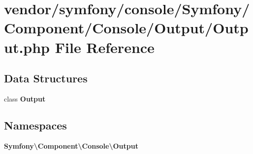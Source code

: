 \section{vendor/symfony/console/\+Symfony/\+Component/\+Console/\+Output/\+Output.php File Reference}
\label{_output_8php}
\subsection*{Data Structures}
\begin{DoxyCompactItemize}
\item 
class {\bf Output}
\end{DoxyCompactItemize}
\subsection*{Namespaces}
\begin{DoxyCompactItemize}
\item 
 {\bf Symfony\textbackslash{}\+Component\textbackslash{}\+Console\textbackslash{}\+Output}
\end{DoxyCompactItemize}
